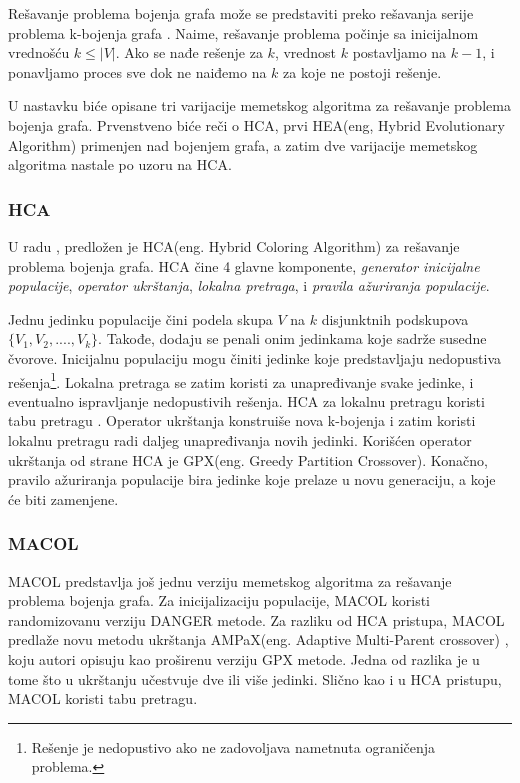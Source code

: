 \documentclass[a4paper]{article}
\begin{document}
Rešavanje problema bojenja grafa može se predstaviti preko rešavanja serije problema k-bojenja grafa \cite{galinier1999hybrid}. 
Naime, rešavanje problema počinje sa inicijalnom vrednošću $k \leq |V|$. 
Ako se nađe rešenje za $k$, vrednost $k$ postavljamo na $k-1$, i ponavljamo proces sve dok ne naiđemo na $k$ za koje ne postoji rešenje.

U nastavku biće opisane tri varijacije memetskog algoritma za rešavanje problema bojenja grafa. Prvenstveno biće reči o HCA, prvi HEA(eng, Hybrid Evolutionary Algorithm) primenjen nad bojenjem grafa, a zatim dve varijacije memetskog algoritma nastale po uzoru na HCA.

\subsubsection{HCA}
U radu \cite{galinier1999hybrid}, predložen je HCA(eng. Hybrid Coloring Algorithm) za rešavanje problema bojenja grafa.
HCA čine 4 glavne komponente, \textit{generator inicijalne populacije}, \textit{operator ukrštanja}, \textit{lokalna pretraga}, i \textit{pravila ažuriranja populacije}.

Jednu jedinku populacije čini podela skupa $V$ na $k$  disjunktnih podskupova $\{V_1, V_2, ...., V_k\}$. Takođe, dodaju se penali onim jedinkama koje sadrže susedne čvorove. Inicijalnu populaciju mogu činiti jedinke koje predstavljaju nedopustiva rešenja\footnote{Rešenje je nedopustivo ako ne zadovoljava nametnuta ograničenja problema.}. 
Lokalna pretraga se zatim koristi za unapređivanje svake jedinke, i eventualno ispravljanje nedopustivih rešenja.
HCA za lokalnu pretragu koristi tabu pretragu \cite{tabu_pretraga_miskovic}.
Operator ukrštanja konstruiše nova k-bojenja i zatim koristi lokalnu pretragu radi daljeg unapređivanja novih jedinki. 
Korišćen operator ukrštanja od strane HCA je GPX(eng. Greedy Partition Crossover)\cite{galinier1999hybrid}.
Konačno, pravilo ažuriranja populacije bira jedinke koje prelaze u novu generaciju, a koje će biti zamenjene.
\subsubsection{MACOL}
MACOL \cite{lu2010memetic} predstavlja još jednu verziju memetskog algoritma za rešavanje problema bojenja grafa. Za inicijalizaciju populacije, MACOL koristi randomizovanu verziju DANGER \cite{glover1996coloring} metode. 
Za razliku od HCA pristupa, MACOL predlaže novu metodu ukrštanja AMPaX(eng. Adaptive Multi-Parent crossover) \cite{lu2010memetic}, koju autori opisuju kao proširenu verziju GPX metode. Jedna od razlika je u tome što u ukrštanju učestvuje dve ili više jedinki. Slično kao i u HCA pristupu, MACOL koristi tabu pretragu.
\end{document}
